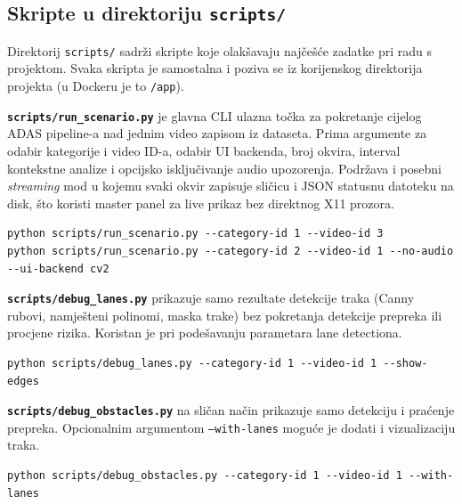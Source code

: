 \subsection{Skripte u direktoriju \texttt{scripts/}}

Direktorij \texttt{scripts/} sadrži skripte koje olakšavaju najčešće zadatke pri radu s projektom. Svaka skripta je samostalna i poziva se iz korijenskog direktorija projekta (u Dockeru je to \texttt{/app}).

\textbf{\texttt{scripts/run\_scenario.py}} je glavna CLI ulazna točka za pokretanje cijelog ADAS pipeline-a nad jednim video zapisom iz dataseta. Prima argumente za odabir kategorije i video ID-a, odabir UI backenda, broj okvira, interval kontekstne analize i opcijsko isključivanje audio upozorenja. Podržava i posebni \textit{streaming} mod u kojemu svaki okvir zapisuje sličicu i JSON statusnu datoteku na disk, što koristi master panel za live prikaz bez direktnog X11 prozora.

\begin{lstlisting}[style=bashcode, caption={Pokretanje scenarija iz naredbenog retka}, label={lst:run_scenario}]
python scripts/run_scenario.py --category-id 1 --video-id 3
python scripts/run_scenario.py --category-id 2 --video-id 1 --no-audio --ui-backend cv2
\end{lstlisting}

\textbf{\texttt{scripts/debug\_lanes.py}} prikazuje samo rezultate detekcije traka (Canny rubovi, namješteni polinomi, maska trake) bez pokretanja detekcije prepreka ili procjene rizika. Koristan je pri podešavanju parametara lane detectiona.

\begin{lstlisting}[style=bashcode, caption={Debug vizualizacija detekcije traka}, label={lst:debug_lanes}]
python scripts/debug_lanes.py --category-id 1 --video-id 1 --show-edges
\end{lstlisting}

\textbf{\texttt{scripts/debug\_obstacles.py}} na sličan način prikazuje samo detekciju i praćenje prepreka. Opcionalnim argumentom \texttt{--with-lanes} moguće je dodati i vizualizaciju traka.

\begin{lstlisting}[style=bashcode, caption={Debug vizualizacija detekcije prepreka}, label={lst:debug_obs}]
python scripts/debug_obstacles.py --category-id 1 --video-id 1 --with-lanes
\end{lstlisting}

